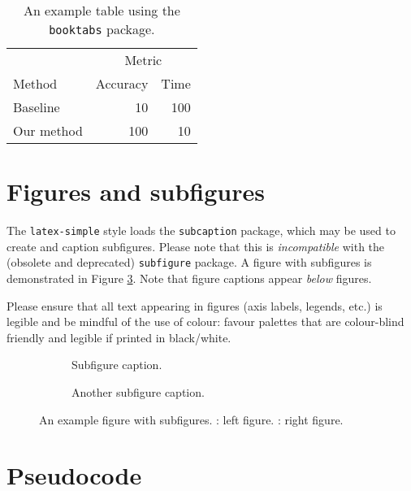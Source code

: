 \documentclass[11pt]{article}
\begin{document}
\begin{table}
  \caption{An example table using the \texttt{booktabs} package.}
  \label{example_table}
  \centering
  \begin{tabular}{lrr}
    \toprule
    & \multicolumn{2}{c}{Metric} \\
    \cmidrule{2-3}
    Method & Accuracy & Time \\
    \midrule
    Baseline & 10 & 100 \\
    Our method & 100 & 10 \\
    \bottomrule
  \end{tabular}
\end{table}

\section{Figures and subfigures}

The \texttt{latex-simple} style loads the \texttt{subcaption} package, which may be used to create and caption subfigures. Please note that this is \emph{incompatible} with the (obsolete and deprecated) \texttt{subfigure} package. A figure with subfigures is demonstrated in Figure \ref{example_figure}. Note that figure captions appear \emph{below} figures.

Please ensure that all text appearing in figures (axis labels, legends, etc.) is legible and be mindful of the use of colour: favour palettes that are colour-blind friendly and legible if printed in black/white.

\begin{figure}
  \begin{subfigure}[t]{0.5\linewidth}
    \centering
    \caption{Subfigure caption.}
    \label{example_figure_left}
  \end{subfigure}
  \begin{subfigure}[t]{0.5\linewidth}
    \centering
    \caption{Another subfigure caption.}
    \label{example_figure_right}
  \end{subfigure}
  \caption{An example figure with subfigures. : left figure. : right figure.}
  \label{example_figure}
\end{figure}

\section{Pseudocode}
\label{sec:code}
\end{document}
